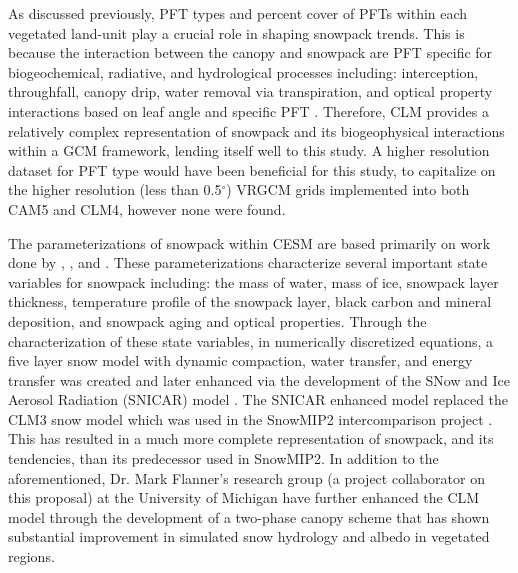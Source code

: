 \documentclass[11pt]{article}
\begin{document}
As discussed previously, PFT types and percent cover of PFTs within each vegetated land-unit play a crucial role in shaping snowpack trends. This is because the interaction between the canopy and snowpack are PFT specific for biogeochemical, radiative, and hydrological processes including: interception, throughfall, canopy drip, water removal via transpiration, and optical property interactions based on leaf angle and specific PFT \citep{lawrence2011parameterization}.  Therefore, CLM provides a relatively complex representation of snowpack and its biogeophysical interactions within a GCM framework, lending itself well to this study.   A higher resolution dataset for PFT type would have been beneficial for this study, to capitalize on the higher resolution (less than 0.5$^\circ$) VRGCM grids implemented into both CAM5 and CLM4, however none were found.

The parameterizations of snowpack within CESM are based primarily on work done by \citet{anderson1976point}, \citet{jordan1991one}, and \citet{yongjiu1997land}. These parameterizations characterize several important state variables for snowpack including: the mass of water, mass of ice, snowpack layer thickness, temperature profile of the snowpack layer, black carbon and mineral deposition, and snowpack aging and optical properties. Through the characterization of these state variables, in numerically discretized equations, a five layer snow model with dynamic compaction, water transfer, and energy transfer was created and later enhanced via the development of the SNow and Ice Aerosol Radiation (SNICAR) model \citep{lawrence2011parameterization}.  The SNICAR enhanced model replaced the CLM3 snow model which was used in the SnowMIP2 intercomparison project \citep{rutter2009SnowMIP2}.  This has resulted in a much more complete representation of snowpack, and its tendencies, than its predecessor used in SnowMIP2.  In addition to the aforementioned, Dr. Mark Flanner's research group (a project collaborator on this proposal) at the University of Michigan have further enhanced the CLM model through the development of a two-phase canopy scheme that has shown substantial improvement in simulated snow hydrology and albedo in vegetated regions.

\end{document}
